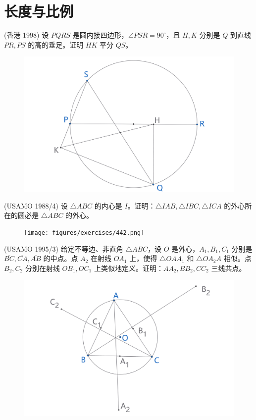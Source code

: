 \part{长度与比例}

\begin{exercise}
    (香港 1998) 设 $PQRS$ 是圆内接四边形，$\angle PSR = 90^\circ$，且 $H, K$ 分别是 $Q$ 到直线 $PR, PS$ 的高的垂足。证明 $HK$ 平分 $QS$。
\end{exercise}
\begin{figure}[H]
    \centering
    \includegraphics[width=0.7\linewidth]{figures/exercises/441.png}
\end{figure}


\begin{exercise}
    (USAMO 1988/4) 设 $\triangle ABC$ 的内心是 $I$。证明：$\triangle IAB, \triangle IBC, \triangle ICA$ 的外心所在的圆必是 $\triangle ABC$ 的外心。
\end{exercise}
\begin{figure}[H]
    \centering
    \texttt{[image: figures/exercises/442.png]}
\end{figure}


\newpage 
\begin{exercise}
    (USAMO 1995/3) 给定不等边、非直角 $\triangle ABC$，设 $O$ 是外心，$A_1, B_1, C_1$ 分别是 $\overline{BC}, \overline{CA}, \overline{AB}$ 的中点。点 $A_2$ 在射线 $OA_1$ 上，使得 $\triangle OAA_1$ 和 $\triangle OA_2A$ 相似。点 $B_2, C_2$ 分别在射线 $OB_1, OC_1$ 上类似地定义。证明：$AA_2, BB_2, CC_2$ 三线共点。
\end{exercise}
\begin{figure}[H]
    \centering
    \includegraphics[width=0.7\linewidth]{figures/exercises/443.png}
\end{figure}


